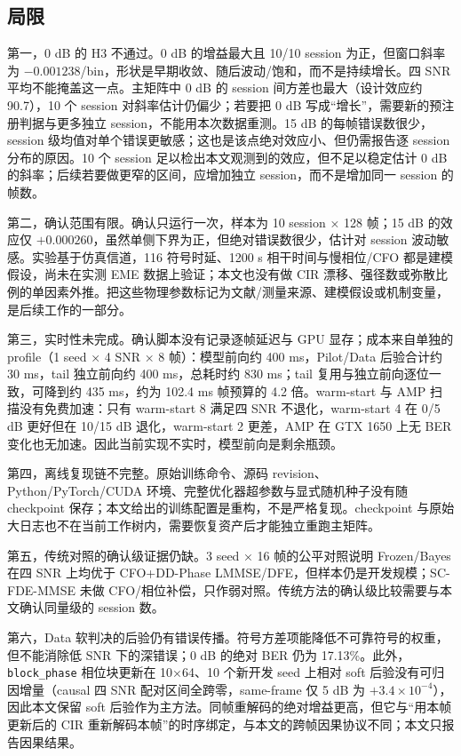 \subsection{局限}

第一，0 dB 的 H3 不通过。0 dB 的增益最大且 10/10 session 为正，但窗口斜率为 $-0.001238$/bin，形状是早期收敛、随后波动/饱和，而不是持续增长。四 SNR 平均不能掩盖这一点。主矩阵中 0 dB 的 session 间方差也最大（设计效应约 90.7），10 个 session 对斜率估计仍偏少；若要把 0 dB 写成“增长”，需要新的预注册判据与更多独立 session，不能用本次数据重测。15 dB 的每帧错误数很少，session 级均值对单个错误更敏感；这也是该点绝对效应小、但仍需报告逐 session 分布的原因。10 个 session 足以检出本文观测到的效应，但不足以稳定估计 0 dB 的斜率；后续若要做更窄的区间，应增加独立 session，而不是增加同一 session 的帧数。

第二，确认范围有限。确认只运行一次，样本为 10 session × 128 帧；15 dB 的效应仅 $+0.000260$，虽然单侧下界为正，但绝对错误数很少，估计对 session 波动敏感。实验基于仿真信道，116 符号时延、1200 s 相干时间与慢相位/CFO 都是建模假设，尚未在实测 EME 数据上验证；本文也没有做 CIR 漂移、强径数或弥散比例的单因素外推。把这些物理参数标记为文献/测量来源、建模假设或机制变量，是后续工作的一部分。

第三，实时性未完成。确认脚本没有记录逐帧延迟与 GPU 显存；成本来自单独的 profile（1 seed × 4 SNR × 8 帧）：模型前向约 400 ms，Pilot/Data 后验合计约 30 ms，tail 独立前向约 400 ms，总耗时约 830 ms；tail 复用与独立前向逐位一致，可降到约 435 ms，约为 102.4 ms 帧预算的 4.2 倍。warm-start 与 AMP 扫描没有免费加速：只有 warm-start 8 满足四 SNR 不退化，warm-start 4 在 0/5 dB 更好但在 10/15 dB 退化，warm-start 2 更差，AMP 在 GTX 1650 上无 BER 变化也无加速。因此当前实现不实时，模型前向是剩余瓶颈。

第四，离线复现链不完整。原始训练命令、源码 revision、Python/PyTorch/CUDA 环境、完整优化器超参数与显式随机种子没有随 checkpoint 保存；本文给出的训练配置是重构，不是严格复现。checkpoint 与原始大日志也不在当前工作树内，需要恢复资产后才能独立重跑主矩阵。

第五，传统对照的确认级证据仍缺。3 seed × 16 帧的公平对照说明 Frozen/Bayes 在四 SNR 上均优于 CFO+DD-Phase LMMSE/DFE，但样本仍是开发规模；SC-FDE-MMSE 未做 CFO/相位补偿，只作弱对照。传统方法的确认级比较需要与本文确认同量级的 session 数。

第六，Data 软判决的后验仍有错误传播。符号方差项能降低不可靠符号的权重，但不能消除低 SNR 下的深错误；0 dB 的绝对 BER 仍为 17.13\%。此外，\texttt{block\_phase} 相位块更新在 10×64、10 个新开发 seed 上相对 soft 后验没有可归因增量（causal 四 SNR 配对区间全跨零，same-frame 仅 5 dB 为 $+3.4\times10^{-4}$），因此本文保留 soft 后验作为主方法。同帧重解码的绝对增益更高，但它与“用本帧更新后的 CIR 重新解码本帧”的时序绑定，与本文的跨帧因果协议不同；本文只报告因果结果。


